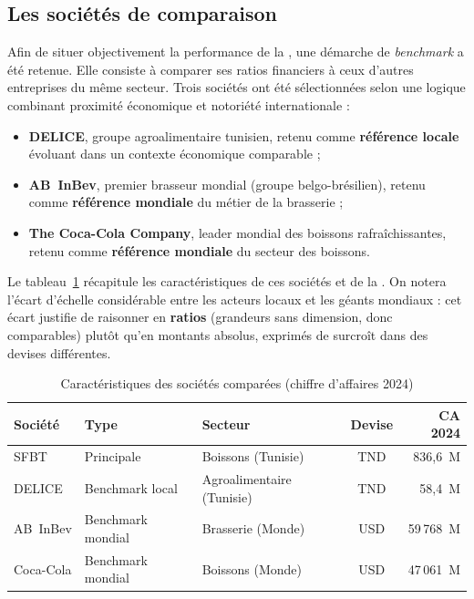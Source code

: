 \subsection{Les sociétés de comparaison}
\par Afin de situer objectivement la performance de la \sfbt, une démarche de
\textit{benchmark} a été retenue. Elle consiste à comparer ses ratios financiers
à ceux d'autres entreprises du même secteur. Trois sociétés ont été sélectionnées
selon une logique combinant proximité économique et notoriété internationale :
\begin{itemize}[noitemsep]
  \item \textbf{DELICE}, groupe agroalimentaire tunisien, retenu comme
        \textbf{référence locale} évoluant dans un contexte économique comparable ;
  \item \textbf{AB~InBev}, premier brasseur mondial (groupe belgo-brésilien),
        retenu comme \textbf{référence mondiale} du métier de la brasserie ;
  \item \textbf{The Coca-Cola Company}, leader mondial des boissons
        rafraîchissantes, retenu comme \textbf{référence mondiale} du secteur des
        boissons.
\end{itemize}

\par Le tableau~\ref{tab:bench_soc} récapitule les caractéristiques de ces
sociétés et de la \sfbt. On notera l'écart d'échelle considérable entre les
acteurs locaux et les géants mondiaux : cet écart justifie de raisonner en
\textbf{ratios} (grandeurs sans dimension, donc comparables) plutôt qu'en montants
absolus, exprimés de surcroît dans des devises différentes.

\begin{table}[H]
  \centering
  \caption[Sociétés du benchmark]{Caractéristiques des sociétés comparées (chiffre d'affaires 2024)}
  \label{tab:bench_soc}
  \begin{tabular}{|l|l|l|c|r|}
    \hline
    \textbf{Société} & \textbf{Type} & \textbf{Secteur} & \textbf{Devise} & \textbf{CA 2024} \\ \hline
    SFBT & Principale & Boissons (Tunisie) & TND & 836,6~M \\ \hline
    DELICE & Benchmark local & Agroalimentaire (Tunisie) & TND & 58,4~M \\ \hline
    AB~InBev & Benchmark mondial & Brasserie (Monde) & USD & 59\,768~M \\ \hline
    Coca-Cola & Benchmark mondial & Boissons (Monde) & USD & 47\,061~M \\ \hline
  \end{tabular}
\end{table}

